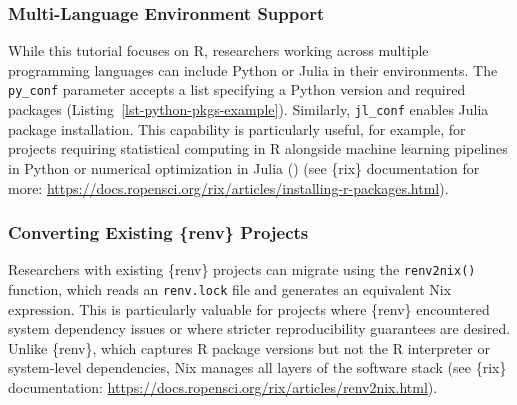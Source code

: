 \documentclass[
  man,
  longtable,
  nolmodern,
  notxfonts,
  notimes,
  colorlinks=true,linkcolor=blue,citecolor=blue,urlcolor=blue]{apa7}
\newenvironment{Shaded}{\begin{snugshade}}{\end{snugshade}}
\newcommand{\AttributeTok}[1]{\textcolor[rgb]{0.40,0.45,0.13}{#1}}
\newcommand{\FunctionTok}[1]{\textcolor[rgb]{0.28,0.35,0.67}{#1}}
\newcommand{\NormalTok}[1]{\textcolor[rgb]{0.00,0.23,0.31}{#1}}
\newcommand{\OtherTok}[1]{\textcolor[rgb]{0.00,0.23,0.31}{#1}}
\newcommand{\StringTok}[1]{\textcolor[rgb]{0.13,0.47,0.30}{#1}}
\begin{document}
\subsubsection{Multi-Language Environment
Support}\label{multi-language-environment-support}

While this tutorial focuses on R, researchers working across multiple
programming languages can include Python or Julia in their environments.
The \texttt{py\_conf} parameter accepts a list specifying a Python
version and required packages (Listing~\ref{lst-python-pkgs-example}).
Similarly, \texttt{jl\_conf} enables Julia package installation. This
capability is particularly useful, for example, for projects requiring
statistical computing in R alongside machine learning pipelines in
Python or numerical optimization in Julia
() (see
\{rix\} documentation for more:
\url{https://docs.ropensci.org/rix/articles/installing-r-packages.html}).

\begin{codelisting}

\caption{\label{lst-python-pkgs-example}Including Python packages}

\centering{

\begin{Shaded}
\begin{Highlighting}[]
\NormalTok{py\_conf }\OtherTok{=} \FunctionTok{list}\NormalTok{(}\AttributeTok{py\_version =} \StringTok{"3.12"}\NormalTok{, }\AttributeTok{py\_pkgs =} \FunctionTok{c}\NormalTok{(}\StringTok{"polars"}\NormalTok{, }\StringTok{"pandas"}\NormalTok{))}
\end{Highlighting}
\end{Shaded}

}

\end{codelisting}%

\subsubsection{Converting Existing \{renv\}
Projects}\label{converting-existing-renv-projects}

Researchers with existing \{renv\} projects can migrate using the
\texttt{renv2nix()} function, which reads an \texttt{renv.lock} file and
generates an equivalent Nix expression. This is particularly valuable
for projects where \{renv\} encountered system dependency issues or
where stricter reproducibility guarantees are desired. Unlike \{renv\},
which captures R package versions but not the R interpreter or
system-level dependencies, Nix manages all layers of the software stack
(see \{rix\} documentation:
\url{https://docs.ropensci.org/rix/articles/renv2nix.html}).
\end{document}
